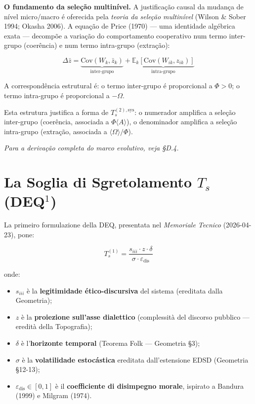 \Proved{} \textbf{O fundamento da sele\c{c}\~{a}o multinível.} A
justifica\c{c}\~{a}o causal da mudan\c{c}a de n\'{i}vel micro/macro
\'{e} oferecida pela \textit{teoria da sele\c{c}\~{a}o multinível}
(Wilson \& Sober 1994; Okasha 2006). A equa\c{c}\~{a}o de Price (1970)
--- uma identidade alg\'{e}brica exata --- decompõe a varia\c{c}\~{a}o
do comportamento cooperativo num termo inter-grupo (coer\^{e}ncia) e
num termo intra-grupo (extra\c{c}\~{a}o):

\[
\Delta\bar{z} = \underbrace{\mathrm{Cov}(W_k,\bar{z}_k)}_{\text{inter-grupo}} + \underbrace{\mathbb{E}_k\!\left[\mathrm{Cov}(W_{ik},z_{ik})\right]}_{\text{intra-grupo}} \tag{Price 1970}
\]

\Hypoth{} A correspond\^{e}ncia estrutural \'{e}: o termo inter-grupo
\'{e} proporcional a \(\Phi > 0\); o termo intra-grupo \'{e}
proporcional a \(-\Omega\).

Esta estrutura justifica a forma de \(T_s^{(2),\text{sys}}\): o
numerador amplifica a sele\c{c}\~{a}o inter-grupo (coer\^{e}ncia,
associada a \(\Phi\langle A\rangle\)), o denominador amplifica a
sele\c{c}\~{a}o intra-grupo (extra\c{c}\~{a}o, associada a
\(\langle\Omega\rangle/\Phi\)).

\textit{Para a deriva\c{c}\~{a}o completa do marco evolutivo, veja §D.4.}



\section{\texorpdfstring{La Soglia di Sgretolamento \(T_s\)
(DEQ$^1$)}{La Soglia di Sgretolamento T\_s (DEQ$^1$)}}\label{la-soglia-di-sgretolamento-t_s-dequxb9}

La primeiro formulazione della DEQ, presentata nel \emph{Memoriale Tecnico}
(2026-04-23), pone:

\[
T_s^{(1)} = \frac{s_{iii} \cdot z \cdot \delta}{\sigma \cdot \varepsilon_{\text{dis}}}
\]

onde:

\begin{itemize}
\tightlist
\item
  \(s_{iii}\) è la \textbf{legitimidade ético-discursiva} del sistema
  (ereditata dalla Geometria);
\item
  \(z\) è la \textbf{proiezione sull'asse dialettico} (complessità del
  discorso pubblico --- eredità della Topografia);
\item
  \(\delta\) è l'\textbf{horizonte temporal} (Teorema Folk ---
  Geometria \S{}3);
\item
  \(\sigma\) è la \textbf{volatilidade estocástica} ereditata
  dall'estensione EDSD (Geometria \S{}12-13);
\item
  \(\varepsilon_{\text{dis}} \in [0,1]\) è il \textbf{coefficiente di
  disimpegno morale}, ispirato a Bandura (1999) e Milgram (1974).
\end{itemize}

